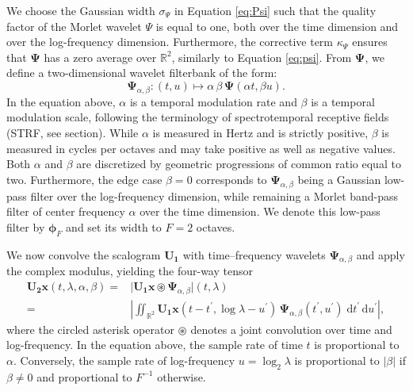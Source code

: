 \documentclass{bmcart}
\newcommand{\lnameref}[1]{%
\bgroup
\let\nmu\MakeLowercase
\nameref{#1}\egroup}
\newcommand{\nmu}{}
\begin{document}
We choose the Gaussian width $\sigma_{\Psi}$ in Equation \ref{eq:Psi} such that the quality factor of the Morlet wavelet $\Psi$ is equal to one, both over the time dimension and over the log-frequency dimension.
Furthermore, the corrective term $\kappa_{\Psi}$ ensures that $\boldsymbol{\Psi}$ has a zero average over $\mathbb{R}^2$, similarly to Equation \ref{eq:psi}.
From $\mathbf{\Psi}$, we define a two-dimensional wavelet filterbank of the form:
\begin{equation}
\mathbf{\Psi}_{\alpha,\beta} : (t, u) \longmapsto
\alpha \, \beta \, \mathbf{\Psi}(\alpha t, \beta u).
\end{equation}
In the equation above, $\alpha$ is a temporal modulation rate and $\beta$ is a temporal modulation scale, following the terminology of spectrotemporal receptive fields (STRF, see \lnameref{sec:related-work} section).
While $\alpha$ is measured in Hertz and is strictly positive, $\beta$ is measured in cycles per octaves and may take positive as well as negative values.
Both $\alpha$ and $\beta$ are discretized by geometric progressions of common ratio equal to two.
Furthermore, the edge case $\beta=0$ corresponds to $\mathbf{\Psi}_{\alpha,\beta}$ being a Gaussian low-pass filter over the log-frequency dimension, while remaining a Morlet band-pass filter of center frequency $\alpha$ over the time dimension.
We denote this low-pass filter by $\boldsymbol{\phi}_F$ and set its width to $F=2$ octaves.

We now convolve the scalogram $\mathbf{U_1}$ with time--frequency wavelets $\mathbf{\Psi}_{\alpha,\beta}$ and apply the complex modulus, yielding the four-way tensor
\begin{align}
\mathbf{U_2}\boldsymbol{x} (t, \lambda, \alpha, \beta)
=&
\big \vert
\mathbf{U_1}\boldsymbol{x} \circledast \boldsymbol{\Psi}_{\alpha,\beta}
\big \vert (t, \lambda)
\nonumber \\
=&
\left\vert
\iint_{\mathbb{R}^2}
\mathbf{U_1}\boldsymbol{x}(t - t^\prime, \log \lambda - u^\prime)\,
\boldsymbol{\Psi}_{\alpha,\beta}(t^\prime, u^\prime)\;
\mathrm{d}t^\prime \, \mathrm{d}u^\prime
\right\vert,
\label{eq:U2}
\end{align}
where the circled asterisk operator $\circledast$ denotes a joint convolution over time and log-frequency.
In the equation above, the sample rate of time $t$ is proportional to $\alpha$.
Conversely, the sample rate of log-frequency $u = \log_2 \lambda$ is proportional to $\vert\beta\vert$ if $\beta \neq 0$ and proportional to $F^{-1}$ otherwise.
\end{document}

